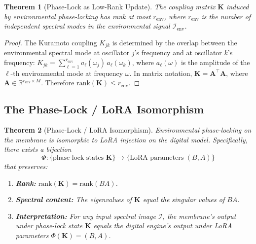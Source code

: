 \documentclass[11pt,twocolumn,a4paper]{article}
\newtheorem{theorem}{Theorem}[section]
\theoremstyle{definition}
\theoremstyle{remark}
\newcommand{\R}{\mathbb{R}}
\begin{document}
\begin{theorem}[Phase-Lock as Low-Rank Update]\label{thm:phase-lock-low-rank}
The coupling matrix $\mathbf{K}$ induced by environmental phase-locking has rank at most $r_{\mathrm{env}}$, where $r_{\mathrm{env}}$ is the number of independent spectral modes in the environmental signal $\mathcal{I}_{\mathrm{env}}$.
\end{theorem}

\begin{proof}
The Kuramoto coupling $K_{jk}$ is determined by the overlap between the environmental spectral mode at oscillator $j$'s frequency and at oscillator $k$'s frequency: $K_{jk} = \sum_{\ell=1}^{r_{\mathrm{env}}} a_\ell(\omega_j) \, a_\ell(\omega_k)$, where $a_\ell(\omega)$ is the amplitude of the $\ell$-th environmental mode at frequency $\omega$.  In matrix notation, $\mathbf{K} = \mathbf{A}^\top \mathbf{A}$, where $\mathbf{A} \in \R^{r_{\mathrm{env}} \times M}$.  Therefore $\mathrm{rank}(\mathbf{K}) \leq r_{\mathrm{env}}$.
\end{proof}

\subsection{The Phase-Lock / LoRA Isomorphism}

\begin{theorem}[Phase-Lock / LoRA Isomorphism]\label{thm:phase-lock-isomorphism}
Environmental phase-locking on the membrane is isomorphic to LoRA injection on the digital model.  Specifically, there exists a bijection
\begin{equation}\label{eq:isomorphism}
    \Phi : \{\text{phase-lock states } \mathbf{K}\} \to \{\text{LoRA parameters } (B, A)\}
\end{equation}
that preserves:
\begin{enumerate}[label=(\alph*)]
    \item \textbf{Rank:} $\mathrm{rank}(\mathbf{K}) = \mathrm{rank}(BA)$.
    \item \textbf{Spectral content:} The eigenvalues of $\mathbf{K}$ equal the singular values of $BA$.
    \item \textbf{Interpretation:} For any input spectral image $\mathcal{I}$, the membrane's output under phase-lock state $\mathbf{K}$ equals the digital engine's output under LoRA parameters $\Phi(\mathbf{K}) = (B, A)$.
\end{enumerate}
\end{theorem}
\end{document}

